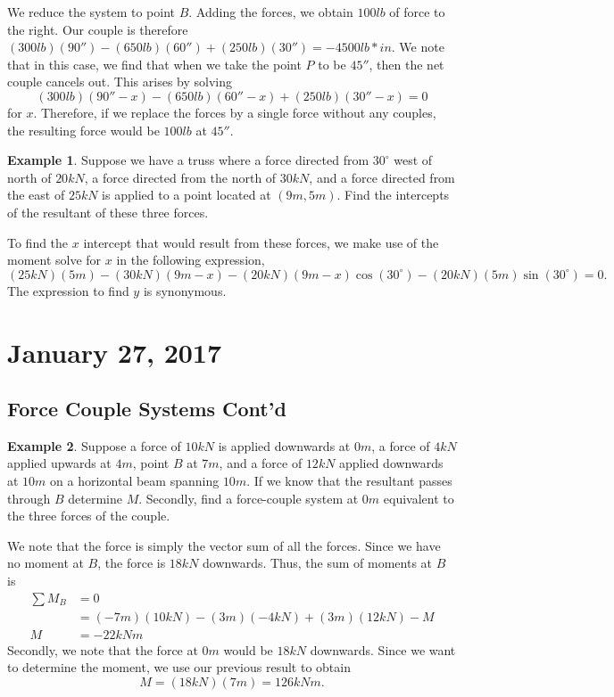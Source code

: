 \documentclass[11pt]{article}
\theoremstyle{plain} %
\theoremstyle{definition}
\theoremstyle{example}
\newtheorem*{example}{Example}
\theoremstyle{remark}
\begin{document}
We reduce the system to point $B$. Adding the forces, we obtain $100lb$ of force to the right. Our couple is therefore $(300lb)(90'')-(650lb)(60'')+(250lb)(30'') = -4500lb*in$. We note that in this case, we find that when we take the point $P$ to be $45''$, then the net couple cancels out. This arises by solving 
$$(300lb)(90''-x) -(650lb)(60''-x) + (250lb)(30''-x)=0$$for $x$. Therefore, if we replace the forces by a single force without any couples, the resulting force would be $100lb$ at $45''$. 



\begin{example}
Suppose we have a truss where a force directed from $30^{\circ}$ west of north of $20kN$, a force directed from the north of $30kN$, and a force directed from the east of $25kN$ is applied to a point located at $(9m, 5m)$. Find the intercepts of the resultant of these three forces. 
\end{example}
To find the $x$ intercept that would result from these forces, we make use of the moment solve for $x$ in the following expression,
$$(25kN)(5m)-(30kN)(9m-x)-(20kN)(9m-x)\cos\left(30^{\circ}\right)-(20kN)(5m)\sin\left(30^{\circ}\right) =0.$$
The expression to find $y$ is synonymous. 

\section{January 27, 2017}

\subsection{Force Couple Systems Cont'd}

\begin{example}
Suppose a force of $10kN$ is applied downwards at $0m$, a force of $4kN$ applied upwards at $4m$, point $B$ at $7m$, and a force of $12kN$ applied downwards at $10m$ on a horizontal beam spanning $10m$. If we know that the resultant passes through $B$ determine $M$. Secondly, find a force-couple system at $0m$ equivalent to the three forces of the couple.  
\end{example}

We note that the force is simply the vector sum of all the forces. Since we have no moment at $B$, the force is $18kN$ downwards. Thus, the sum of moments at $B$ is 
\begin{align*}
\sum M_B &=0\\
 &= (-7m)(10kN) -(3m)(-4kN) + (3m)(12kN) -M\\
 M &= -22kNm
\end{align*}
Secondly, we note that the force at $0m$ would be $18kN$ downwards. Since we want to determine the moment, we use our previous result to obtain 
$$M = (18kN)(7m) = 126kNm.$$
\end{document}
